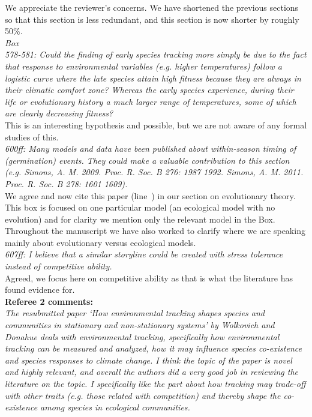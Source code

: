 \documentclass[11pt,letterpaper]{article}
\newcommand{\lr}[1]{line~\lineref{#1}}
\begin{document}
We appreciate the reviewer's concerns. We have shortened the previous sections so that this section is less redundant, and this section is now shorter by roughly 50\%.\\

\emph{Box\\
578-581: Could the finding of early species tracking more simply be due to the fact that
response to environmental variables (e.g. higher temperatures) follow a logistic curve where
the late species attain high fitness because they are always in their climatic comfort zone?
Whereas the early species experience, during their life or evolutionary history a much larger
range of temperatures, some of which are clearly decreasing fitness?}\\

This is an interesting hypothesis and possible, but we are not aware of any formal studies of this.\\

\emph{600ff: Many models and data have been published about within-season timing of (germination)
events. They could make a valuable contribution to this section (e.g. Simons, A. M. 2009.
Proc. R. Soc. B 276: 1987 1992. Simons, A. M. 2011. Proc. R. Soc. B 278: 1601 1609).}\\

We agree and now cite this paper (\lr{simonsref1}) in our section on evolutionary theory. This box is focused on one particular model (an ecological model with no evolution) and for clarity we mention only the relevant model in the Box. Throughout the manuscript we have also worked to clarify where we are speaking mainly about evolutionary versus ecological models. \\

\emph{607ff: I believe that a similar storyline could be created with stress tolerance instead of
competitive ability.}\\

Agreed, we focus here on competitive ability as that is what the literature has found evidence for.\\

{\bf Referee 2 comments:} \\

\emph{The resubmitted paper `How environmental tracking shapes species and communities in
stationary and non-stationary systems' by Wolkovich and Donahue deals with environmental
tracking, specifically how environmental tracking can be measured and analyzed, how it may
influence species co-existence and species responses to climate change. I think the topic of
the paper is novel and highly relevant, and overall the authors did a very good job in
reviewing the literature on the topic. I specifically like the part about how tracking may
trade-off with other traits (e.g. those related with competition) and thereby shape the co-
existence among species in ecological communities.}\\
\end{document}
